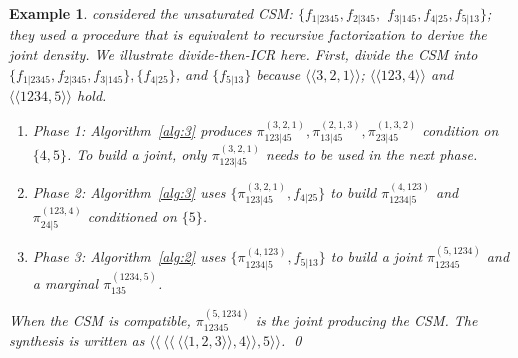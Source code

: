 \documentclass[12pt,a4paper]{article}
\newtheorem{example}{Example}
\begin{document}
\begin{example}\label{ex:3}\rm
\citet[Section~4]{Arnold1996} considered the unsaturated CSM:
$\{f_{1|2345},f_{2|345},$ $f_{3|145},f_{4|25},f_{5|13}\}$; they
used a procedure that is equivalent  to recursive factorization to derive the joint density.
We illustrate divide-then-ICR here.  First, divide the CSM into
$ \{f_{1|2345},f_{2|345},f_{3|145}\}, \{f_{4|25} \}$,  and $\{f_{5|13}\}$ because
 $\langle \langle 3,2,1\rangle \rangle$; $\langle \langle 123,4\rangle \rangle$  and
$\langle \langle 1234,5\rangle \rangle$ hold.
\begin{enumerate}
  \item Phase 1: Algorithm~\ref{alg:3} produces $\pi_{123|45}^{(3,2,1)}, \pi_{13|45}^{(2,1,3)}, \pi_{23|45}^{(1,3,2)}$ condition on $\{4,5\}$. To build a joint, only $\pi_{123|45}^{(3,2,1)}$ needs to be used in the next phase.
  \item Phase 2: Algorithm~\ref{alg:3} uses $\{\pi_{123|45}^{(3,2,1)}, f_{4|25}\}$ to build $\pi_{1234|5}^{(4,123)}$  and $\pi_{24|5}^{(123,4)}$ conditioned on $\{5\}$.
  \item Phase 3: Algorithm~\ref{alg:2} uses $\{ \pi_{1234|5}^{(4,123)}, f_{5|13}\}$ to build a joint $\pi_{12345}^{(5,1234)}$ and a marginal $\pi_{135}^{(1234,5)}$.
\end{enumerate}

When the CSM is compatible, $\pi_{12345}^{(5,1234)}$ is the joint producing the CSM.
The synthesis is written as $\langle \langle ~\langle \langle ~\langle \langle 1,2,3\rangle \rangle , 4\rangle \rangle ,5\rangle \rangle$. \qed
\end{example}
\end{document}
